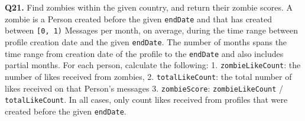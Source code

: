\textbf{Q21.}
Find zombies within the given country, and return their zombie scores.
A zombie is a Person created before the given \texttt{endDate} and that
has created between \texttt{{[}0,\ 1)} Messages per month, on average,
during the time range between profile creation date and the given
\texttt{endDate}. The number of months spans the time range from
creation date of the profile to the \texttt{endDate} and also includes
partial months.
For each person, calculate the following: 1. \texttt{zombieLikeCount}: the number of likes received from zombies, 2. \texttt{totalLikeCount}: the total number of likes received on that Person's messages 3. \texttt{zombieScore}: \texttt{zombieLikeCount} / \texttt{totalLikeCount}. In all cases, only count likes received from profiles that were created
before the given \texttt{endDate}.
